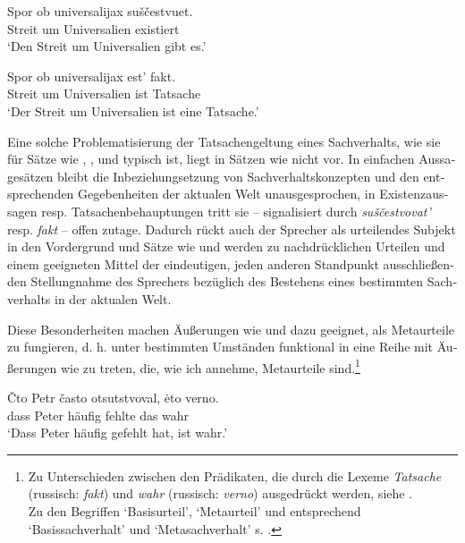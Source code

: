 \documentclass[output=paper]{langscibook}
\begin{document}
\begin{otherlanguage}{german}
\ea \label{ex:zi83:30}
    \gll Spor ob universalijax suščestvuet. \\
    Streit um Universalien existiert \\
    \glt ‘Den Streit um Universalien gibt es.’
    
\ex \label{ex:zi83:31}
    \gll Spor ob universalijax est’ fakt. \\
    Streit um Universalien ist Tatsache \\
    \glt ‘Der Streit um Universalien ist eine Tatsache.’
    
\z

\noindent Eine solche Problematisierung der Tatsachengeltung eines Sachverhalts, wie sie für Sätze wie , ,  und  typisch ist, liegt in Sätzen wie  nicht vor. In einfachen Aussagesätzen bleibt die Inbeziehungsetzung von Sach\-ver\-halts\-kon\-zep\-ten und den entsprechenden Gegebenheiten der aktualen Welt unausgesprochen, in Existenzaussagen resp. Tatsachenbehauptungen tritt sie -- signalisiert durch \textit{suščestvovat’} resp. \textit{fakt} -- offen zutage. Dadurch rückt auch der Sprecher als urteilendes Subjekt in den Vordergrund und Sätze wie  und  werden zu nachdrücklichen Urteilen und einem geeigneten Mittel der eindeutigen, jeden anderen Standpunkt ausschließenden Stellungnahme des Spre\-chers bezüglich des Bestehens eines bestimmten Sachverhalts in der aktualen Welt.

Diese Besonderheiten machen Äußerungen wie  und  dazu geeignet, als Metaurteile zu fungieren, d. h. unter bestimmten Umständen funktional in eine Reihe mit Äußerungen wie  zu treten, die, wie ich annehme, Metaurteile sind.\footnote{Zu Unterschieden zwischen den Prädikaten, die durch die Lexeme \textit{Tatsache} (russisch: \textit{fakt}) und \textit{wahr} (russisch: \textit{verno}) ausgedrückt werden, siehe \citet{Zimmermann82Explizite-und}. \\ Zu den Begriffen ‘Basisurteil’, ‘Metaurteil’ und entsprechend ‘Basissachverhalt’ und ‘Metasachverhalt’ s. \citet[415 f.]{povarov1960sobytijnyj-i-suzdenceskij-aspekty-logiki-v-svjazi-s-logiceskimi-zadacami-techniki}.}

\ea \label{ex:zi83:32}
    \gll Čto Petr často otsutstvoval, ėto verno. \\
    dass Peter häufig fehlte das wahr \\
    \glt ‘Dass Peter häufig gefehlt hat, ist wahr.’
\z


\end{otherlanguage}
\end{document}
